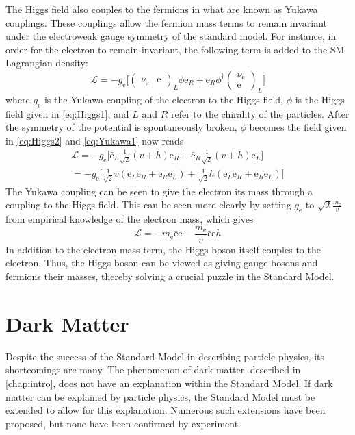 The Higgs field also couples to the fermions in what are known as Yukawa couplings. These couplings allow the fermion mass terms to remain invariant under the electroweak gauge symmetry of the standard model. For instance, in order for the electron to remain invariant, the following term is added to the SM Lagrangian density:
\begin{equation}
    \mathcal{L} = -g_\mathrm{e}\Big[\begin{pmatrix}\bar{\nu}_\mathrm{e} & \bar{\mathrm{e}}\end{pmatrix}_L\phi\mathrm{e}_R+\bar{\mathrm{e}}_R\phi^\dagger\begin{pmatrix}\nu_\mathrm{e} \\ \mathrm{e}\end{pmatrix}_L\Big]
    \label{eq:Yukawa1}
\end{equation}
where $g_\mathrm{e}$ is the Yukawa coupling of the electron to the Higgs field, $\phi$ is the Higgs field given in \cref{eq:Higgs1}, and $L$ and $R$ refer to the chirality of the particles. After the symmetry of the potential is spontaneously broken, $\phi$ becomes the field given in \cref{eq:Higgs2} and \cref{eq:Yukawa1} now reads
\begin{align}
        \mathcal{L} = -g_\mathrm{e}\Big[ \bar{\mathrm{e}}_L\frac{1}{\sqrt{2}}(v+h)\mathrm{e}_R+\bar{\mathrm{e}}_R\frac{1}{\sqrt{2}}(v+h)\mathrm{e}_L\Big] \\
        = -g_\mathrm{e}\Big[\frac{1}{\sqrt{2}}v(\bar{\mathrm{e}}_L\mathrm{e}_R+\bar{\mathrm{e}}_R\mathrm{e}_L)+\frac{1}{\sqrt{2}}h(\bar{\mathrm{e}}_L\mathrm{e}_R+\bar{\mathrm{e}}_R\mathrm{e}_L)\Big]
\end{align}
The Yukawa coupling can be seen to give the electron its mass through a coupling to the Higgs field. This can be seen more clearly by setting $g_\mathrm{e}$ to $\sqrt{2}\frac{m_\mathrm{e}}{v}$ from empirical knowledge of the electron mass, which gives
\begin{equation}
    \mathcal{L} = -m_\mathrm{e}\bar{\mathrm{e}}\mathrm{e} -\frac{m_\mathrm{e}}{v}\bar{\mathrm{e}}\mathrm{e}h
\end{equation}
In addition to the electron mass term, the Higgs boson itself couples to the electron.
Thus, the Higgs boson can be viewed as giving gauge bosons and fermions their masses, thereby solving a crucial puzzle in the Standard Model.

\section{Dark Matter}
Despite the success of the Standard Model in describing particle physics, its shortcomings are many. The phenomenon of dark matter, described in \cref{chap:intro}, does not have an explanation within the Standard Model. If dark matter can be explained by particle physics, the Standard Model must be extended to allow for this explanation. Numerous such extensions have been proposed, but none have been confirmed by experiment. 


